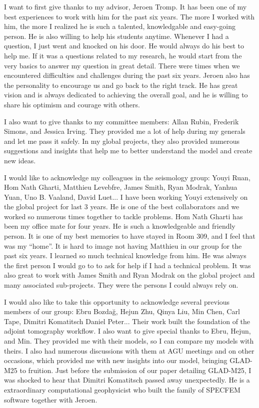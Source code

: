 I want to first give thanks to my advisor, Jeroen Tromp.
It has been one of my best experiences to work with him for the past six years.
The more I worked with him, the more I realized he is such a talented,
knowledgable and easy-going person. He is also willing to help his students anytime.
Whenever I had a question, I just went and knocked on his door. He would always do his best to help me.
If it was a questions related to my research, he would start from the very basics to
answer my question in great detail.
There were times when we encountered difficulties and challenges during the past six years.
Jeroen also has the personality to encourage us and go back to the right track.
He has great vision and is always dedicated to achieving the overall goal, and he is willing to
share his optimism and courage with others.

I also want to give thanks to my committee members: Allan Rubin, Frederik Simons,
and Jessica Irving. They provided me a lot of help during my generals and let me
pass it safely. In my global projects, they also provided numerous suggestions
and insights that help me to better understand the model and create new ideas.

I would like to acknowledge my colleagues in the seismology group: Youyi Ruan, Hom Nath Gharti, Matthieu Levebfre, James Smith, Ryan Modrak, Yanhua Yuan, Uno B. Vaaland, David Luet...
I have been working Youyi extensively on the global project for last 3 years. He is one of the best collaborators and we worked so numerous times together to tackle problems. 
Hom Nath Gharti has been my office mate for four years.
He is such a knowledgeable and friendly person. It is one of my best memories to have stayed in Room 309, and I feel that was my ``home''.
It is hard to image not having Matthieu in
our group for the past six years. I learned so much technical knowledge from him. He was always the first person I would go to to ask for help if I had a technical
problem.
It was also great to work with James Smith and Ryan Modrak on the global
project and many associated sub-projects. They were the persons I could always
rely on.

I would also like to take this opportunity to acknowledge several previous members of our
group: Ebru Bozda\u g, Hejun Zhu, Qinya Liu, Min Chen, Carl Tape, Dimitri Komatitsch
Daniel Peter... Their work built the foundation of the adjoint tomography workflow.
I also want to give special thanks to Ebru, Hejun, and Min. They provided me with
their models, so I can compare my models with theirs. I also had numerous discussions
with them at AGU meetings and on other occasions, which provided me with new insights into
our model, bringing GLAD-M25 to fruition. Just before the submission of our paper detailing
GLAD-M25, I was shocked to hear that Dimitri Komatitsch passed away unexpectedly.
He is a extraordinary computational geophysicist who built the family of SPECFEM
software together with Jeroen.

